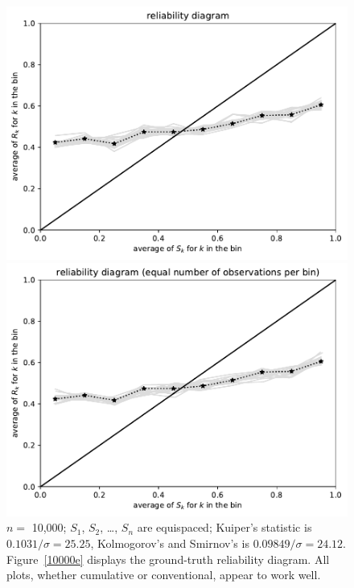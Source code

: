 \documentclass{article}
\begin{document}
\begin{figure}
\begin{centering}
\parbox{\imsize}{\includegraphics[width=\imsize]
                {./codes/unweighted/10000_10_0_0/equiprob.pdf}}
\quad\quad
\parbox{\imsize}{\includegraphics[width=\imsize]
                {./codes/unweighted/10000_10_0_0/equisamp.pdf}}

\end{centering}
\caption{$n =$ 10,000; $S_1$, $S_2$, \dots, $S_n$ are equispaced;
         Kuiper's statistic is $0.1031 / \sigma = 25.25$,
         Kolmogorov's and Smirnov's is $0.09849 / \sigma = 24.12$.
Figure~\ref{10000e} displays the ground-truth reliability diagram.
All plots, whether cumulative or conventional, appear to work well.
}
\label{10000}
\end{figure}
\end{document}
